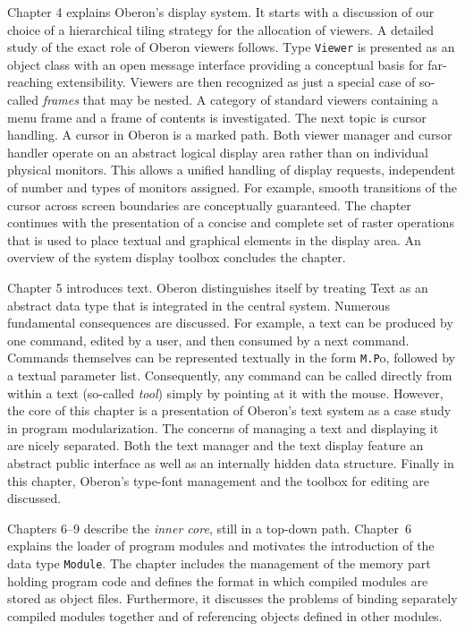 Chapter 4 explains Oberon's display system. It starts with a
discussion of our choice of a hierarchical tiling strategy for the
allocation of viewers. A detailed study of the exact role of Oberon
viewers follows. Type {\tt Viewer\/} is presented as an object class with an
open message interface providing a conceptual basis for far-reaching
extensibility. Viewers are then recognized as just a special case of
so-called {\it frames\/} that may be nested. A category of standard viewers
containing a menu frame and a frame of contents is investigated. The
next topic is cursor handling. A cursor in Oberon is a marked
path. Both viewer manager and cursor handler operate on an abstract
logical display area rather than on individual physical monitors. This
allows a unified handling of display requests, independent of number
and types of monitors assigned. For example, smooth transitions of the
cursor across screen boundaries are conceptually guaranteed. The
chapter continues with the presentation of a concise and complete set
of raster operations that is used to place textual and graphical
elements in the display area. An overview of the system display
toolbox concludes the chapter.

Chapter 5 introduces text. Oberon distinguishes itself by treating
Text as an abstract data type that is integrated in the central
system. Numerous fundamental consequences are discussed. For example,
a text can be produced by one command, edited by a user, and then
consumed by a next command. Commands themselves can be represented
textually in the form {\tt M.P\/}o, followed by a textual parameter
list. Consequently, any command can be called directly from within a
text (so-called {\it tool\/}) simply by pointing at it with the
mouse. However, the core of this chapter is a presentation of Oberon's
text system as a case study in program modularization. The concerns of
managing a text and displaying it are nicely separated. Both the text
manager and the text display feature an abstract public interface as
well as an internally hidden data structure. Finally in this chapter,
Oberon's type-font management and the toolbox for editing are
discussed.

Chapters 6--9 describe the {\it inner core\/}, still in a top-down
path. Chapter~6 explains the loader of program modules and motivates
the introduction of the data type {\tt Module\/}. The chapter includes the
management of the memory part holding program code and defines the
format in which compiled modules are stored as object
files. Furthermore, it discusses the problems of binding separately
compiled modules together and of referencing objects defined in other
modules.

